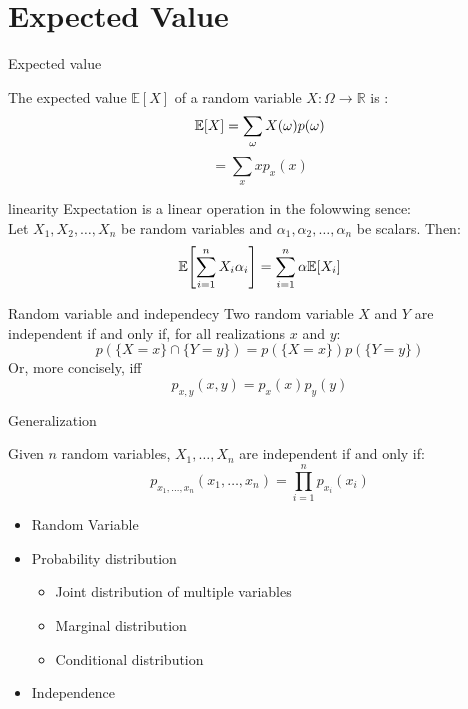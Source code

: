 \section{Expected Value}
\begin{parag}{Expected value}
    \begin{definition}
        The expected value $\mathbb{E}[X]$ of a random variable $X:  \Omega \to \mathbb{R}$ is : 
        \[\mathbb{E}[X] = \sum_\omega{X(\omega)p(\omega)}\]
        \[= \sum_x xp_x(x)\]
    \end{definition}
\end{parag}
\begin{parag}{linearity}
    Expectation is a linear operation in the folowwing sence:
    \\
    Let $X_1, X_2, \dots, X_n$ be random variables and $\alpha_1, \alpha_2, \dots, \alpha_n$ be scalars. Then:
    \[\E \left[\sum_{i=1}^n X_i\alpha_i\right] = \sum_{i=1}^n\alpha\E [X_i]\]
\end{parag}
\begin{parag}{Random variable and independecy}
    Two random variable $X$ and $Y$ are independent if and only if, for all realizations $x$ and $y$:
    \[p(\{X = x\} \cap \{Y = y\}) = p(\{X = x\}) p(\{Y = y\})\]
    Or, more concisely, iff
    \[p_{x, y}(x, y) = p_x(x)p_y(y)\]
\end{parag}
\begin{parag}{Generalization}
    \begin{theoreme}
        Given $n$ random variables, $X_1, \dots, X_n$ are independent if and only if:
        \[p_{x_1, \dots, x_n}(x_1, \dots, x_n) = \prod_{i = 1}^n p_{x_i}(x_i) \]
    \end{theoreme}
\end{parag}
\begin{resume}
\begin{itemize}
    \item Random Variable
    \item Probability distribution
    \begin{itemize}
        \item Joint distribution of multiple variables
        \item Marginal distribution
        \item Conditional distribution
    \end{itemize}
    \item Independence
\end{itemize}    
\end{resume}